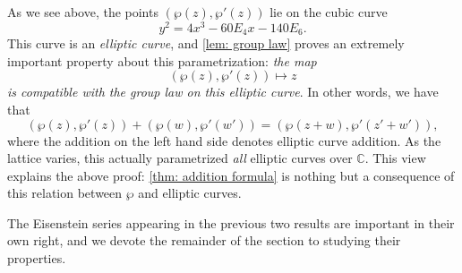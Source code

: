 \documentclass[12pt,reqno]{amsart}
\theoremstyle{plain}
\numberwithin{equation}{section}
\begin{document}
As we see above, the points $(\wp(z), \wp'(z))$ lie on the cubic curve \[y^2 = 4x^3 - 60E_4 x -140E_6.\] This curve is an \textit{elliptic curve}, and \cref{lem: group law} proves an extremely important property about this parametrization: \textit{the map} \[(\wp(z),\wp'(z))\mapsto z\] \textit{is compatible with the group law on this elliptic curve}.  In other words, we have that \[(\wp(z),\wp'(z)) + (\wp(w),\wp'(w')) = (\wp(z+w),\wp'(z'+w')),\]
where the addition on the left hand side denotes elliptic curve addition. As the lattice varies, this actually parametrized \textit{all} elliptic curves over $\mathbb C$. This view explains the above proof: \cref{thm: addition formula} is nothing but a consequence of this relation between $\wp$ and elliptic curves.


The Eisenstein series appearing in the previous two results are important in their own right, and we devote the remainder of the section to studying their properties.
\end{document}
